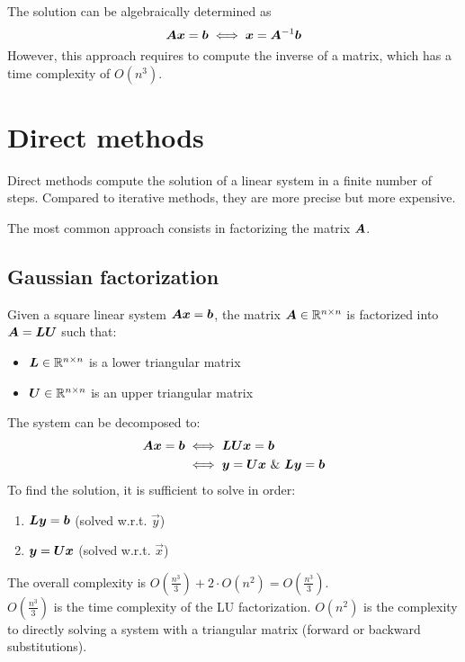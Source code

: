 The solution can be algebraically determined as 
\[ {\bm{A}}{\bm{x}} = {\bm{b}} \iff {\bm{x}} = {\bm{A}}^{-1}{\bm{b}} \]
However, this approach requires to compute the inverse of a matrix, which has a time complexity of $O(n^3)$.



\section{Direct methods}
Direct methods compute the solution of a linear system in a finite number of steps.
Compared to iterative methods, they are more precise but more expensive.

The most common approach consists in factorizing the matrix ${\bm{A}}$.

\subsection{Gaussian factorization}
Given a square linear system ${\bm{A}}{\bm{x}} = {\bm{b}}$, 
the matrix ${\bm{A}} \in \mathbb{R}^{n \times n}$ is factorized into ${\bm{A}} = {\bm{L}}{\bm{U}}$ such that:
\begin{itemize}
    \item ${\bm{L}} \in \mathbb{R}^{n \times n}$ is a lower triangular matrix
    \item ${\bm{U}} \in \mathbb{R}^{n \times n}$ is an upper triangular matrix
\end{itemize}
%
The system can be decomposed to:
\[
    \begin{split}
        {\bm{A}}{\bm{x}} = {\bm{b}} & \iff {\bm{LU}}{\bm{x}} = {\bm{b}} \\
            & \iff {\bm{y}} = {\bm{U}}{\bm{x}} \text{ \& } {\bm{L}}{\bm{y}} = {\bm{b}}
    \end{split}
\]
To find the solution, it is sufficient to solve in order:
\begin{enumerate}
    \item ${\bm{L}}{\bm{y}} = {\bm{b}}$ (solved w.r.t. $\vec{y}$)
    \item ${\bm{y}} = {\bm{U}}{\bm{x}}$ (solved w.r.t. $\vec{x}$)
\end{enumerate}

The overall complexity is $O(\frac{n^3}{3}) + 2 \cdot O(n^2) = O(\frac{n^3}{3})$.\\
$O(\frac{n^3}{3})$ is the time complexity of the LU factorization. 
$O(n^2)$ is the complexity to directly solving a system with a triangular matrix (forward or backward substitutions).


